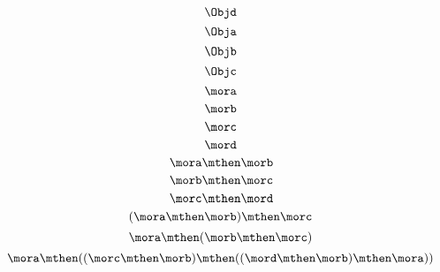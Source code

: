 {\begin{forslides}
        \begin{equation}
            \label{eq:00}
            \Objd
        \end{equation}
        \begin{equation}
            \label{eq:01}
            \Obja
        \end{equation}
        \begin{equation}
            \label{eq:02}
            \Objb
        \end{equation}
        \begin{equation}
            \label{eq:03}
            \Objc
        \end{equation}
        \begin{equation}
            \label{eq:04}
            \mora
        \end{equation}
        \begin{equation}
            \label{eq:05}
            \morb
        \end{equation}
        \begin{equation}
            \label{eq:06}
            \morc
        \end{equation}
        \begin{equation}
            \label{eq:07}
            \mord
        \end{equation}
        \begin{equation}
            \label{eq:08}
            \mora \mthen \morb
        \end{equation}
        \begin{equation}
            \label{eq:09}
            \morb \mthen \morc
        \end{equation}
        \begin{equation}
            \label{eq:10}
            \morc \mthen \mord
        \end{equation}
        \begin{equation}
            \label{eq:11}
            (\mora \mthen \morb) \mthen \morc
        \end{equation}
        \begin{equation}
            \label{eq:12}
            \mora \mthen  (\morb \mthen \morc )
        \end{equation}
        \begin{equation}
            \label{eq:13}
            \mora \mthen  ((\morc \mthen \morb ) \mthen (( \mord \mthen \morb ) \mthen \mora ))

\end{equation}
\end{forslides}}
